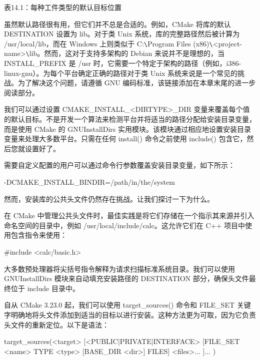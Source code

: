 \begin{center}
表14.1：每种工件类型的默认目标位置
\end{center}

虽然默认路径很有用，但它们并不总是合适的。例如，CMake 将库的默认 DESTINATION 设置为 lib。对于类 Unix 系统，库的完整路径然后被计算为 /usr/local/lib，而在 Windows 上则类似于 C:\verb|\|Program Files (x86)\verb|\|<project-name>\verb|\|lib。然而，这对于支持多架构的 Debian 来说并不是理想的，当 INSTALL\_PREFIX 是 /usr 时，它需要一个特定于架构的路径（例如，i386-linux-gnu）。为每个平台确定正确的路径对于类 Unix 系统来说是一个常见的挑战。为了解决这个问题，请遵循 GNU 编码标准，该链接添加在本章末尾的进一步阅读部分。

我们可以通过设置 CMAKE\_INSTALL\_<DIRTYPE>\_DIR 变量来覆盖每个值的默认目标。不是开发一个算法来检测平台并将适当的路径分配给安装目录变量，而是使用 CMake 的 GNUInstallDirs 实用模块。该模块通过相应地设置安装目录变量来处理大多数平台。只需在任何 install() 命令之前使用 include() 包含它，然后您就设置好了。

需要自定义配置的用户可以通过命令行参数覆盖安装目录变量，如下所示：

\begin{shell}
-DCMAKE_INSTALL_BINDIR=/path/in/the/system
\end{shell}

然而，安装库的公共头文件仍然存在挑战。让我们探讨一下为什么。


在 CMake 中管理公共头文件时，最佳实践是将它们存储在一个指示其来源并引入命名空间的目录中，例如 /usr/local/include/calc。这允许它们在 C++ 项目中使用包含指令来使用：

\begin{cpp}
#include <calc/basic.h>
\end{cpp}

大多数预处理器将尖括号指令解释为请求扫描标准系统目录。我们可以使用 GNUInstallDirs 模块来自动填充安装路径的 DESTINATION 部分，确保头文件最终位于 include 目录中。

自从 CMake 3.23.0 起，我们可以使用 target\_sources() 命令和 FILE\_SET 关键字明确地将头文件添加到适当的目标以进行安装。这种方法更为可取，因为它负责头文件的重新定位。以下是语法：

\begin{shell}
target_sources(<target>
    [<PUBLIC|PRIVATE|INTERFACE>
        [FILE_SET <name> TYPE <type> [BASE_DIR <dir>] FILES]
        <files>...
    ]...
)
\end{shell}

